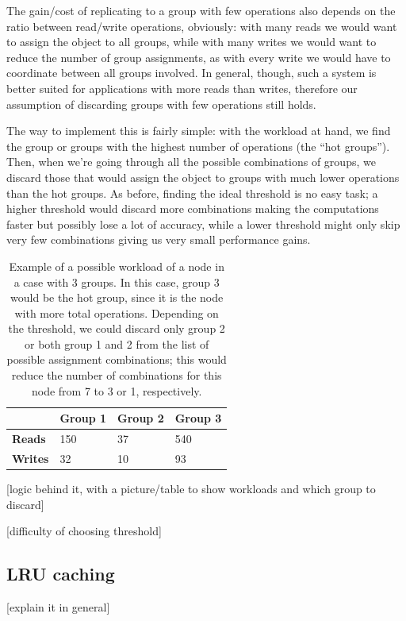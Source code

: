 The gain/cost of replicating to a group with few operations also depends on the ratio between read/write operations, obviously: with many reads we would want to assign the object to all groups, while with many writes we would want to reduce the number of group assignments, as with every write we would have to coordinate between all groups involved. In general, though, such a system is better suited for applications with more reads than writes, therefore our assumption of discarding groups with few operations still holds.

The way to implement this is fairly simple: with the workload at hand, we find the group or groups with the highest number of operations (the ``hot groups''). Then, when we're going through all the possible combinations of groups, we discard those that would assign the object to groups with much lower operations than the hot groups. As before, finding the ideal threshold is no easy task; a higher threshold would discard more combinations making the computations faster but possibly lose a lot of accuracy, while a lower threshold might only skip very few combinations giving us very small performance gains. 


\begin{table}[htb]
  \centering
  \begin{tabular}{l l l l}
    \hline
    & \textbf{Group 1} & \textbf{Group 2} & \textbf{Group 3} \\
    \hline
    \textbf{Reads} & 150 & 37 & 540 \\
    \textbf{Writes} & 32 & 10 & 93 \\
    \hline
  \end{tabular}
  \caption{Example of a possible workload of a node in a case with 3 groups. In this case, group 3 would be the hot group, since it is the node with more total operations. Depending on the threshold, we could discard only group 2 or both group 1 and 2 from the list of possible assignment combinations; this would reduce the number of combinations for this node from 7 to 3 or 1, respectively.}\label{tab:workload-example}
\end{table}

[logic behind it, with a picture/table to show workloads and which group to discard]

[difficulty of choosing threshold]

\subsection{LRU caching}\label{sec:LRU caching}
[explain it in general]

